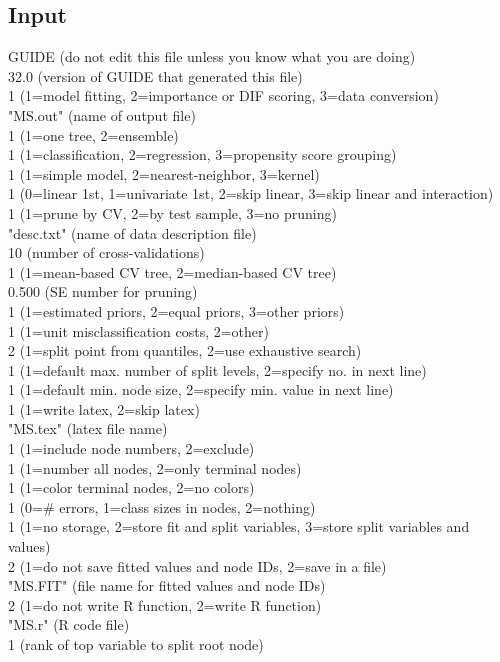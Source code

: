 \documentclass[12pt]{article}
\begin{document}
\subsection{Input}
GUIDE       (do not edit this file unless you know what you are doing)\\
  32.0      (version of GUIDE that generated this file)\\
 1          (1=model fitting, 2=importance or DIF scoring, 3=data conversion)\\
"MS.out"  (name of output file)\\
 1          (1=one tree, 2=ensemble)\\
 1          (1=classification, 2=regression, 3=propensity score grouping)\\
 1          (1=simple model, 2=nearest-neighbor, 3=kernel)\\
 1          (0=linear 1st, 1=univariate 1st, 2=skip linear, 3=skip linear and interaction)\\
 1          (1=prune by CV, 2=by test sample, 3=no pruning)\\
"desc.txt"  (name of data description file)\\
        10  (number of cross-validations)\\
 1          (1=mean-based CV tree, 2=median-based CV tree)\\
     0.500  (SE number for pruning)\\
 1          (1=estimated priors, 2=equal priors, 3=other priors)\\
 1          (1=unit misclassification costs, 2=other)\\
 2          (1=split point from quantiles, 2=use exhaustive search)\\
 1          (1=default max. number of split levels, 2=specify no. in next line)\\
 1          (1=default min. node size, 2=specify min. value in next line)\\
 1          (1=write latex, 2=skip latex)\\
"MS.tex" (latex file name)\\
 1          (1=include node numbers, 2=exclude)\\
 1          (1=number all nodes, 2=only terminal nodes)\\
 1          (1=color terminal nodes, 2=no colors)\\
 1          (0=\# errors, 1=class sizes in nodes, 2=nothing)\\
 1          (1=no storage, 2=store fit and split variables, 3=store split variables and values)\\
 2          (1=do not save fitted values and node IDs, 2=save in a file)\\
"MS.FIT" (file name for fitted values and node IDs)\\
 2          (1=do not write R function, 2=write R function)\\
"MS.r" (R code file)\\
 1          (rank of top variable to split root node)\\
\end{document}
